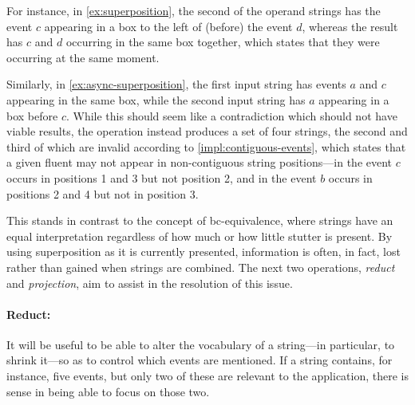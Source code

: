 \documentclass[a4paper,12pt,leqno,twoside]{article}
\newcommand{\bc}{{\rm b\!c}}
\newcommand{\vph}[1]{\vphantom{#1}}
\newcommand{\ebox}[1]{\fbox{$\vph{'(),}#1$}}
\newcommand{\EventString}[1]{%
	\renewcommand*{\do}[1]{\ebox{##1}}%
	\PipeParser{#1}%
}
\begin{document}
For instance, in \cref{ex:superposition}, the second of the operand strings has the event $c$ appearing in a box to the left of (before) the event $d$, whereas the result has $c$ and $d$ occurring in the same box together, which states that they were occurring at the same moment.

Similarly, in \cref{ex:async-superposition}, the first input string has events $a$ and $c$ appearing in the same box, while the second input string has $a$ appearing in a box before $c$. While this should seem like a contradiction which should not have viable results, the operation instead produces a set of four strings, the second and third of which are invalid according to \cref{impl:contiguous-events}, which states that a given fluent may not appear in non-contiguous string positions---in \EventString{a,c|a,b,d|b,c,d} the event $c$ occurs in positions 1 and 3 but not position 2, and in \EventString{a,c|a,b,c|a,c,d|b,c,d} the event $b$ occurs in positions 2 and 4 but not in position 3.

This stands in contrast to the concept of \bc-equivalence, where strings have an equal interpretation regardless of how much or how little stutter is present. By using superposition as it is currently presented, information is often, in fact, lost rather than gained when strings are combined. The next two operations, \textit{reduct} and \textit{projection}, aim to assist in the resolution of this issue.

\paragraph{Reduct:}\label{para:str-op-reduct}
It will be useful to be able to alter the vocabulary of a string---in particular, to shrink it---so as to control which events are mentioned. If a string contains, for instance, five events, but only two of these are relevant to the application, there is sense in being able to focus on those two.
\end{document}
